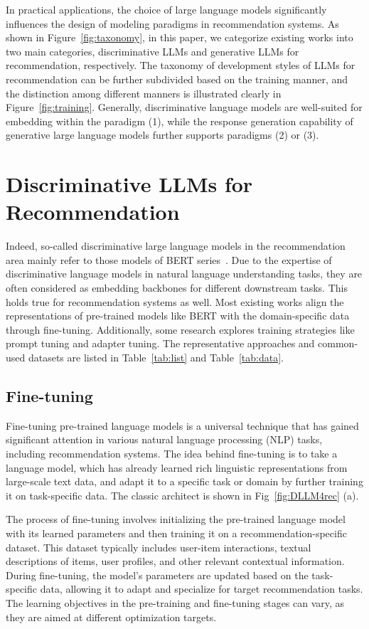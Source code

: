\documentclass[sn-mathphys-num]{sn-jnl}%
\theoremstyle{thmstyleone}%
\theoremstyle{thmstyletwo}%
\theoremstyle{thmstylethree}%
\begin{document}
In practical applications, the choice of large language models significantly influences the design of modeling paradigms in recommendation systems. As shown in Figure~\ref{fig:taxonomy}, in this paper, we categorize existing works into two main categories, discriminative LLMs and generative LLMs for recommendation, respectively. The taxonomy of development styles of LLMs for recommendation can be further subdivided based on the training manner, and the distinction among different manners is illustrated clearly in Figure~\ref{fig:training}. Generally, discriminative language models are well-suited for embedding within the paradigm (1), while the response generation capability of generative large language models further supports paradigms (2) or (3). 

\section{Discriminative LLMs for Recommendation}
Indeed, so-called discriminative large language models in the recommendation area mainly refer to those models of BERT series~\cite{devlin2018bert}. Due to the expertise of discriminative language models in natural language understanding tasks, they are often considered as embedding backbones for different downstream tasks. This holds true for recommendation systems as well. Most existing works align the representations of pre-trained models like BERT with the domain-specific data through fine-tuning. Additionally, some research explores training strategies like prompt tuning and adapter tuning. The representative approaches and common-used datasets are listed in Table~\ref{tab:list} and Table~\ref{tab:data}.
\subsection{Fine-tuning}
\label{sec:Discriminative Fine-tuning}
Fine-tuning pre-trained language models is a universal technique that has gained significant attention in various natural language processing (NLP) tasks, including recommendation systems. The idea behind fine-tuning is to take a language model, which has already learned rich linguistic representations from large-scale text data, and adapt it to a specific task or domain by further training it on task-specific data. The classic architect is shown in Fig~\ref{fig:DLLM4rec} (a).

The process of fine-tuning involves initializing the pre-trained language model with its learned parameters and then training it on a recommendation-specific dataset. This dataset typically includes user-item interactions, textual descriptions of items, user profiles, and other relevant contextual information. During fine-tuning, the model's parameters are updated based on the task-specific data, allowing it to adapt and specialize for target recommendation tasks. The learning objectives in the pre-training and fine-tuning stages can vary, as they are aimed at different optimization targets.
\end{document}
